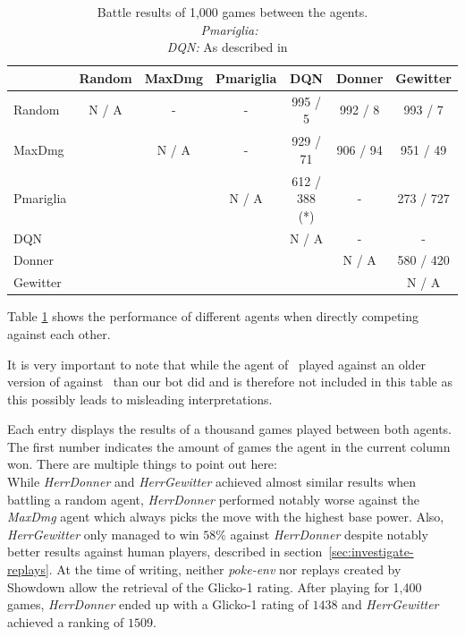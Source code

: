 \begin{table}[h]
  \centering
  \caption{Battle results of 1,000 games between the agents. \\
  \emph{Pmariglia:}~\autocite{Github:pmariglia-showdown} \\
  \emph{DQN:} As described  in ~\autocite{Huang_Lee_2019}}
  \begin{tabular}{|l|c|c|c|c|c|c|}
    \hline
     & Random & MaxDmg & Pmariglia & DQN & Donner   & Gewitter  \\
    \hline
    Random                                         & N / A  & -      & -         & 995 / 5   & 992 / 8  & 993 / 7   \\
    \hline
    MaxDmg                                         &        & N / A  & -         & 929 / 71  & 906 / 94 & 951 / 49  \\
    \hline
    Pmariglia                                      &        &        & N / A     & 612 / 388 (*)  & -        & 273 / 727 \\
    \hline
    DQN                                            &        &        &           & N / A     & -        & -         \\
    \hline
    Donner                                         &        &        &           &           & N / A    & 580 / 420 \\
    \hline
    Gewitter                                       &        &        &           &           &          & N / A     \\                            
    \hline
    \end{tabular}
    \label{tab:agent-performance}
  \end{table}
Table \ref{tab:agent-performance} shows the performance of different agents when directly competing against each other.

It is very important to note that while the agent of~\autocite{Huang_Lee_2019} played against an older version of
against~\autocite*{Github:pmariglia-showdown} than our bot did and is therefore not included in this table as 
this possibly leads to misleading interpretations. 


Each entry displays the results of a thousand games played between both agents. The first number indicates the amount
of games the agent in the current column won. There are multiple things to point out here: \\
While \textit{HerrDonner} and \textit{HerrGewitter} achieved almost similar results when battling a random agent, 
\textit{HerrDonner} performed notably worse against the \textit{MaxDmg} agent which always picks the move with the
highest base power. Also, \textit{HerrGewitter} only managed to win $58\%$ against \textit{HerrDonner} despite notably
better results against human players, described in section~\ref{sec:investigate-replays}. At the time of writing,
neither \textit{poke-env} nor replays created by Showdown allow the retrieval of the Glicko-1 rating. After playing
for 1,400 games, \textit{HerrDonner} ended up with a Glicko-1 rating of $1438$ and \textit{HerrGewitter} achieved
a ranking of $1509$.

